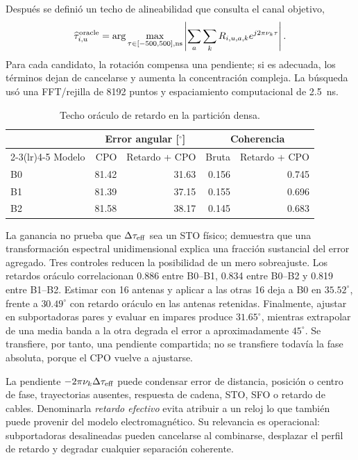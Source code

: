Después se definió un techo de alineabilidad que consulta el canal objetivo,
\begin{equation}
\widehat\tau^{\rm oracle}_{i,u}=
\arg\max_{\tau\in[-500,500],\mathrm{ns}}
\left|
\sum_a\sum_k R_{i,u,a,k}e^{j2\pi\nu_k\tau}
\right|.
\label{eq:oracle_effective_delay}
\end{equation}
Para cada candidato, la rotación compensa una pendiente; si es adecuada, los
términos dejan de cancelarse y aumenta la concentración compleja. La búsqueda usó
una FFT/rejilla de 8192 puntos y espaciamiento computacional de \SI{2.5}{ns}.

\begin{table}[htbp]
\centering\small
\caption{Techo oráculo de retardo en la partición densa.}
\label{tab:oracle_delay_b012}
\begin{tabular}{lrrrr}
\toprule
& \multicolumn{2}{c}{Error angular [$^\circ$]} &
\multicolumn{2}{c}{Coherencia}\\
\cmidrule(lr){2-3}\cmidrule(lr){4-5}
Modelo & CPO & Retardo + CPO & Bruta & Retardo + CPO\\
\midrule
B0 & 81.42 & 31.63 & 0.156 & 0.745\\
B1 & 81.39 & 37.15 & 0.155 & 0.696\\
B2 & 81.58 & 38.17 & 0.145 & 0.683\\
\bottomrule
\end{tabular}
\end{table}

La ganancia no prueba que $\Delta\tau_{\rm eff}$ sea un STO físico; demuestra que
una transformación espectral unidimensional explica una fracción sustancial del
error agregado. Tres controles reducen la posibilidad de un mero sobreajuste. Los
retardos oráculo correlacionan 0.886 entre B0--B1, 0.834 entre B0--B2 y 0.819 entre
B1--B2. Estimar con 16 antenas y aplicar a las otras 16 deja a B0 en
$35.52^\circ$, frente a $30.49^\circ$ con retardo oráculo en las antenas retenidas.
Finalmente, ajustar en subportadoras pares y evaluar en impares produce
$31.65^\circ$, mientras extrapolar de una media banda a la otra degrada el error a
aproximadamente $45^\circ$. Se transfiere, por tanto, una pendiente compartida;
no se transfiere todavía la fase absoluta, porque el CPO vuelve a ajustarse.

La pendiente $-2\pi\nu_k\Delta\tau_{\rm eff}$ puede condensar error de distancia,
posición o centro de fase, trayectorias ausentes, respuesta de cadena, STO, SFO o
retardo de cables. Denominarla \emph{retardo efectivo} evita atribuir a un reloj lo
que también puede provenir del modelo electromagnético. Su relevancia es operacional:
subportadoras desalineadas pueden cancelarse al combinarse, desplazar el perfil de
retardo y degradar cualquier separación coherente.

